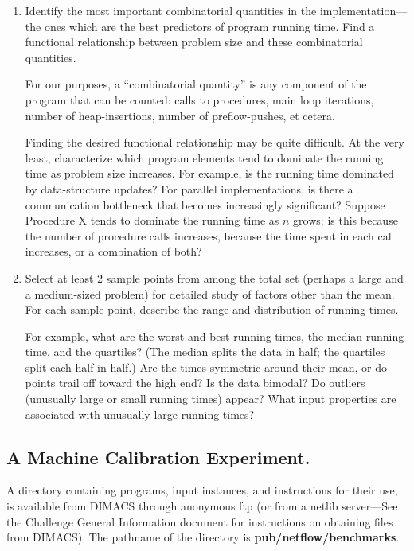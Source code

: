 \begin{enumerate}
\item  Identify the most important combinatorial quantities in 
the implementation---the ones which are the best predictors of program
running time.  Find a functional relationship between problem size and
these combinatorial quantities.

For our purposes, a ``combinatorial quantity'' is any component of the
program that can be counted: calls to procedures, main loop
iterations, number of heap-insertions, number of preflow-pushes, et
cetera.

Finding the desired functional relationship may be quite difficult.
At the very least, characterize which program elements tend to
dominate the running time as problem size increases.  For example, is
the running time dominated by data-structure updates?  For parallel
implementations, is there a communication bottleneck that becomes
increasingly significant?  Suppose Procedure X tends to dominate the
running time as $n$ grows: is this because the number of procedure
calls increases, because the time spent in each call increases, or a
combination of both?

\item  Select at least 2 sample points 
from among the total set (perhaps a large and a medium-sized problem)
for detailed study of factors other than the mean.  For each sample
point, describe the range and distribution of running times.

For example, what are the worst and best running times, the median
running time, and the quartiles?  (The median splits the data in half;
the quartiles split each half in half.)  Are the times symmetric
around their mean, or do points trail off toward the high end?  Is the
data bimodal?  Do outliers (unusually large or small running times)
appear?  What input properties are associated with unusually large
running times?

\end{enumerate} %

\subsection{A Machine Calibration Experiment.}

A directory containing programs, input instances, and instructions for
their use, is available from DIMACS through anonymous ftp (or from a
netlib server---See the Challenge General Information document for
instructions on obtaining files from DIMACS). The pathname of the
directory is {\bf pub/netflow/benchmarks}.


